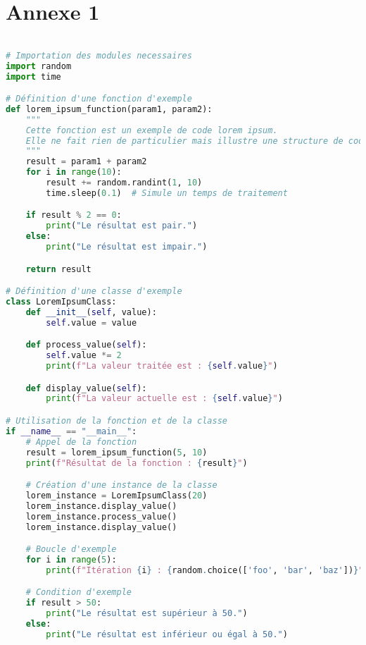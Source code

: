 \chapter*{Annexe 1}

\begin{lstlisting}[language=python, basicstyle=\ttfamily\small, frame=single]

# Importation des modules necessaires
import random
import time

# Définition d'une fonction d'exemple
def lorem_ipsum_function(param1, param2):
    """
    Cette fonction est un exemple de code lorem ipsum.
    Elle ne fait rien de particulier mais illustre une structure de code.
    """
    result = param1 + param2
    for i in range(10):
        result += random.randint(1, 10)
        time.sleep(0.1)  # Simule un temps de traitement

    if result % 2 == 0:
        print("Le résultat est pair.")
    else:
        print("Le résultat est impair.")

    return result

# Définition d'une classe d'exemple
class LoremIpsumClass:
    def __init__(self, value):
        self.value = value

    def process_value(self):
        self.value *= 2
        print(f"La valeur traitée est : {self.value}")

    def display_value(self):
        print(f"La valeur actuelle est : {self.value}")

# Utilisation de la fonction et de la classe
if __name__ == "__main__":
    # Appel de la fonction
    result = lorem_ipsum_function(5, 10)
    print(f"Résultat de la fonction : {result}")

    # Création d'une instance de la classe
    lorem_instance = LoremIpsumClass(20)
    lorem_instance.display_value()
    lorem_instance.process_value()
    lorem_instance.display_value()

    # Boucle d'exemple
    for i in range(5):
        print(f"Itération {i} : {random.choice(['foo', 'bar', 'baz'])}")

    # Condition d'exemple
    if result > 50:
        print("Le résultat est supérieur à 50.")
    else:
        print("Le résultat est inférieur ou égal à 50.")

\end{lstlisting}